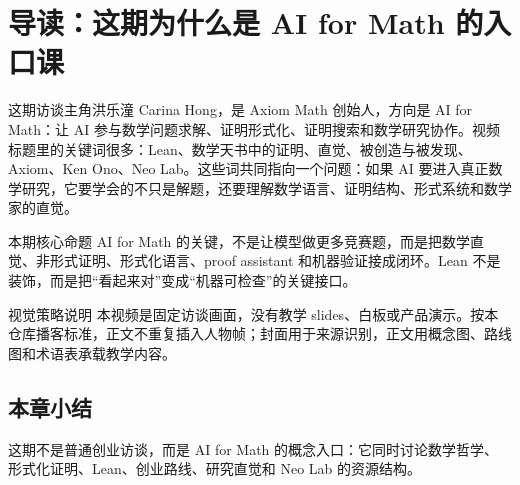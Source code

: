 \section{导读：这期为什么是 AI for Math 的入口课}

这期访谈主角洪乐潼 Carina Hong，是 Axiom Math 创始人，方向是 AI for Math：让 AI 参与数学问题求解、证明形式化、证明搜索和数学研究协作。视频标题里的关键词很多：Lean、数学天书中的证明、直觉、被创造与被发现、Axiom、Ken Ono、Neo Lab。这些词共同指向一个问题：如果 AI 要进入真正数学研究，它要学会的不只是解题，还要理解数学语言、证明结构、形式系统和数学家的直觉。

\begin{importantbox}{本期核心命题}
AI for Math 的关键，不是让模型做更多竞赛题，而是把数学直觉、非形式证明、形式化语言、proof assistant 和机器验证接成闭环。Lean 不是装饰，而是把“看起来对”变成“机器可检查”的关键接口。
\end{importantbox}

\begin{knowledgebox}{视觉策略说明}
本视频是固定访谈画面，没有教学 slides、白板或产品演示。按本仓库播客标准，正文不重复插入人物帧；封面用于来源识别，正文用概念图、路线图和术语表承载教学内容。
\end{knowledgebox}

\subsection{本章小结}

这期不是普通创业访谈，而是 AI for Math 的概念入口：它同时讨论数学哲学、形式化证明、Lean、创业路线、研究直觉和 Neo Lab 的资源结构。


